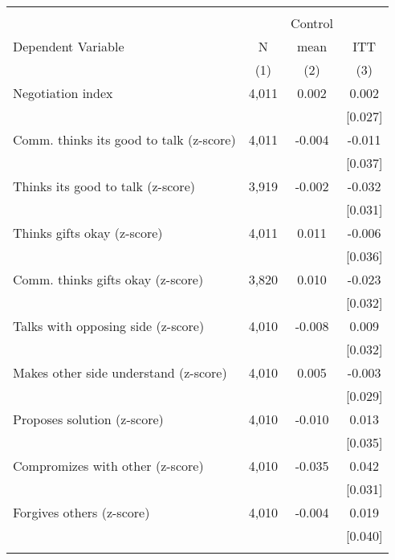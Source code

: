 \begin{tabular}{lccc}
\hline \noalign{\smallskip} &  &  & \\
 &  & Control & \\
Dependent Variable & N & mean & ITT\\
 & (1) & (2) & (3)\\
\noalign{\smallskip}\hline \noalign{\smallskip}Negotiation index & 4,011 & 0.002 & 0.002\\
 &  &  & [0.027]\\
\quad Comm. thinks its good to talk (z-score) & 4,011 & -0.004 & -0.011\\
 &  &  & [0.037]\\
\quad Thinks its good to talk (z-score) & 3,919 & -0.002 & -0.032\\
 &  &  & [0.031]\\
\quad Thinks gifts okay (z-score) & 4,011 & 0.011 & -0.006\\
 &  &  & [0.036]\\
\quad Comm. thinks gifts okay (z-score) & 3,820 & 0.010 & -0.023\\
 &  &  & [0.032]\\
\quad Talks with opposing side (z-score) & 4,010 & -0.008 & 0.009\\
 &  &  & [0.032]\\
\quad Makes other side understand (z-score) & 4,010 & 0.005 & -0.003\\
 &  &  & [0.029]\\
\quad Proposes solution (z-score) & 4,010 & -0.010 & 0.013\\
 &  &  & [0.035]\\
\quad Compromizes with other (z-score) & 4,010 & -0.035 & 0.042\\
 &  &  & [0.031]\\
\quad Forgives others (z-score) & 4,010 & -0.004 & 0.019\\
 &  &  & [0.040]\\
\noalign{\smallskip}\hline\end{tabular}
